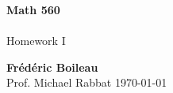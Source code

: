 \documentclass{article}
\begin{document}
		\begin{titlepage}
			\begin{center}
				\vspace*{1cm}
				\textbf{Math 560}\\
				\\
				\vspace{0.5cm}
				Homework I
				
				\vspace{1.5cm}
				
				\textbf{Frédéric Boileau}\\
				\vspace{2cm}
				Prof. 
				Michael Rabbat
				\vfill
				\today
				\thispagestyle{empty}
			\end{center}
		\end{titlepage}

		\clearpage
		
\end{document}
